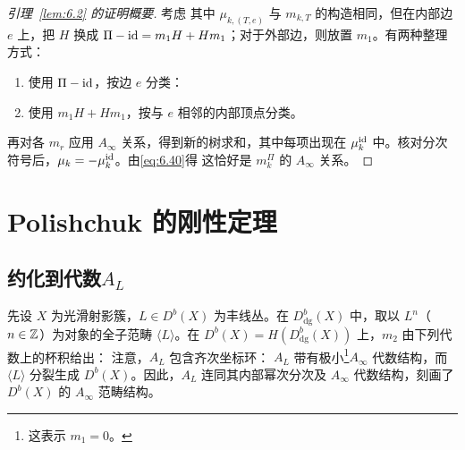 \begin{proof}[引理~\ref{lem:6.2} 的证明概要]
考虑
其中 $\mu_{k,(T,e)}$ 与 $m_{k,T}$ 的构造相同，但在内部边 $e$ 上，把 $H$ 换成 $\Pi-\operatorname{id}=m_1H+Hm_1$；对于外部边，则放置 $m_1$。有两种整理方式：
\begin{enumerate}[label=(\roman*)]
\item 使用 $\Pi-\operatorname{id}$，按边 $e$ 分类：
\item 使用 $m_1H+Hm_1$，按与 $e$ 相邻的内部顶点分类。
\end{enumerate}
再对各 $m_r$ 应用 $A_\infty$ 关系，得到新的树求和，其中每项出现在 $\mu_k^{\operatorname{id}}$ 中。核对分次符号后，$\mu_k=-\mu_k^{\operatorname{id}}$。由\eqref{eq:6.40}得
这恰好是 $m_k^\Pi$ 的 $A_\infty$ 关系。
\end{proof}
\section{Polishchuk 的刚性定理}
\subsection{约化到代数\texorpdfstring{$A_L$}{AL}}
先设 $X$ 为光滑射影簇，$L\in D^b(X)$ 为丰线丛。在 $D^b_{\mathrm{dg}}(X)$ 中，取以 $L^n$（$n\in\mathbb Z$）为对象的全子范畴 $\langle L\rangle$。在 $D^b(X)=H(D^b_{\mathrm{dg}}(X))$ 上，$m_2$ 由下列代数上的杯积给出：
注意，$A_L$ 包含齐次坐标环：
$A_L$ 带有极小\footnote{这表示 $m_1=0$。}$A_\infty$ 代数结构，而 $\langle L\rangle$ 分裂生成 $D^b(X)$。因此，$A_L$ 连同其内部幂次分次及 $A_\infty$ 代数结构，刻画了 $D^b(X)$ 的 $A_\infty$ 范畴结构。
